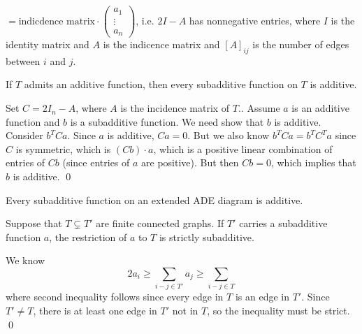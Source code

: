 $= \text{indicdence matrix} \cdot \begin{pmatrix} a_1 \\ \vdots \\ a_n \end{pmatrix}$, i.e. $2I- A$ has nonnegative entries, where $I$ is the identity matrix and $A$ is the indicence matrix and $[A]_{ij}$ is the number of edges between $i$ and $j$. 


















\begin{lem} \label{lem:c}
If $T$ admits an additive function, then every subadditive function on $T$ is additive.
\end{lem}

\pf Set $C=2I_n - A$, where $A$ is the incidence matrix of $T$.. Assume $a$ is an additive function and $b$ is a subadditive function. We need show that $b$ is additive. Consider $b^TCa$. Since $a$ is additive, $Ca=0$. But we also know $b^TCa=b^TC^Ta$ since $C$ is symmetric, which is $(Cb) \cdot a$, which is a positive linear combination of entries of $Cb$ (since entries of $a$ are positive). But then $Cb=0$, which implies that $b$ is additive. \qed \\


\begin{cor} \label{cor:d}
Every subadditive function on an extended ADE diagram is additive. 
\end{cor}


\begin{lem} \label{lem:e}
Suppose that $T \subsetneq T'$ are finite connected graphs. If $T'$ carries a subadditive function $a$, the restriction of $a$ to $T$ is strictly subadditive. 
\end{lem}

\pf We know 
	\[
	2a_i \geq \sum_{i-j \in T'} a_j \geq \sum_{i-j \in T}
	\]
where second inequality follows since every edge in $T$ is an edge in $T'$. Since $T' \neq T$, there is at least one edge in $T'$ not in $T$, so the inequality must be strict. \qed \\




